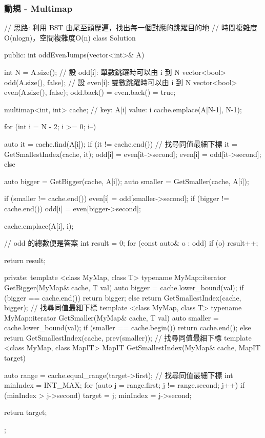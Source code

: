 \subsubsection{動規 - Multimap}
\begin{Code}
// 思路: 利用 BST 由尾至頭歷遍，找出每一個對應的跳躍目的地
// 時間複雜度O(nlogn)，空間複雜度O(n)
class Solution {
public:
    int oddEvenJumps(vector<int>& A) {
        int N = A.size();
        // 設 odd[i]: 單數跳躍時可以由 i 到 N
        vector<bool> odd(A.size(), false);
        // 設 even[i]: 雙數跳躍時可以由 i 到 N
        vector<bool> even(A.size(), false);
        odd.back() = even.back() = true;

        multimap<int, int> cache; // key: A[i] value: i
        cache.emplace(A[N-1], N-1);

        for (int i = N - 2; i >= 0; i--)
        {
            auto it = cache.find(A[i]);
            if (it != cache.end())
            {
                // 找尋同值最細下標
                it = GetSmallestIndex(cache, it);
                odd[i] = even[it->second];
                even[i] = odd[it->second];
            }
            else
            {
                auto bigger = GetBigger(cache, A[i]);
                auto smaller = GetSmaller(cache, A[i]);

                if (smaller != cache.end())
                    even[i] = odd[smaller->second];
                if (bigger != cache.end())
                    odd[i] = even[bigger->second];
            }
            cache.emplace(A[i], i);
        }

        // odd 的總數便是答案
        int result = 0;
        for (const auto& o : odd)
            if (o) result++;

        return result;
    }
private:
    template <class MyMap, class T>
        typename MyMap::iterator GetBigger(MyMap& cache, T val)
    {
        auto bigger = cache.lower_bound(val);
        if (bigger == cache.end())
            return bigger;
        else
            return GetSmallestIndex(cache, bigger); // 找尋同值最細下標
    }
    template <class MyMap, class T>
        typename MyMap::iterator GetSmaller(MyMap& cache, T val)
    {
        auto smaller = cache.lower_bound(val);
        if (smaller == cache.begin())
            return cache.end();
        else
            return GetSmallestIndex(cache, prev(smaller)); // 找尋同值最細下標
    }
    template <class MyMap, class MapIT>
        MapIT GetSmallestIndex(MyMap& cache, MapIT target)
    {
        auto range = cache.equal_range(target->first);
            // 找尋同值最細下標
            int minIndex = INT_MAX;
            for (auto j = range.first; j != range.second; j++)
            {
                if (minIndex > j->second)
                {
                    target = j;
                    minIndex = j->second;
                }
            }

        return target;
    }
};
\end{Code}
